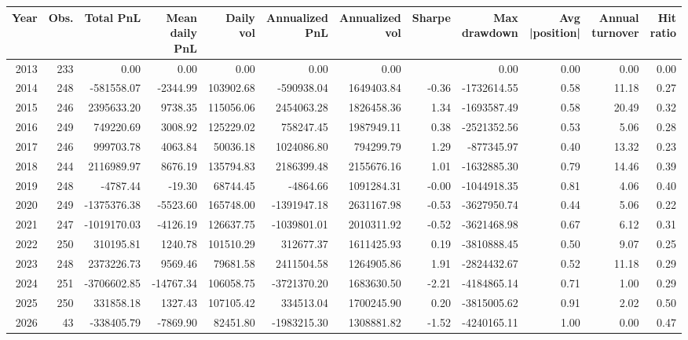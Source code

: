 \begin{tabular}{rrrrrrrrrrrr}
\toprule
Year & Obs. & Total PnL & Mean daily PnL & Daily vol & Annualized PnL & Annualized vol & Sharpe & Max drawdown & Avg |position| & Annual turnover & Hit ratio \\
\midrule
2013 & 233 & 0.00 & 0.00 & 0.00 & 0.00 & 0.00 &  & 0.00 & 0.00 & 0.00 & 0.00 \\
2014 & 248 & -581558.07 & -2344.99 & 103902.68 & -590938.04 & 1649403.84 & -0.36 & -1732614.55 & 0.58 & 11.18 & 0.27 \\
2015 & 246 & 2395633.20 & 9738.35 & 115056.06 & 2454063.28 & 1826458.36 & 1.34 & -1693587.49 & 0.58 & 20.49 & 0.32 \\
2016 & 249 & 749220.69 & 3008.92 & 125229.02 & 758247.45 & 1987949.11 & 0.38 & -2521352.56 & 0.53 & 5.06 & 0.28 \\
2017 & 246 & 999703.78 & 4063.84 & 50036.18 & 1024086.80 & 794299.79 & 1.29 & -877345.97 & 0.40 & 13.32 & 0.23 \\
2018 & 244 & 2116989.97 & 8676.19 & 135794.83 & 2186399.48 & 2155676.16 & 1.01 & -1632885.30 & 0.79 & 14.46 & 0.39 \\
2019 & 248 & -4787.44 & -19.30 & 68744.45 & -4864.66 & 1091284.31 & -0.00 & -1044918.35 & 0.81 & 4.06 & 0.40 \\
2020 & 249 & -1375376.38 & -5523.60 & 165748.00 & -1391947.18 & 2631167.98 & -0.53 & -3627950.74 & 0.44 & 5.06 & 0.22 \\
2021 & 247 & -1019170.03 & -4126.19 & 126637.75 & -1039801.01 & 2010311.92 & -0.52 & -3621468.98 & 0.67 & 6.12 & 0.31 \\
2022 & 250 & 310195.81 & 1240.78 & 101510.29 & 312677.37 & 1611425.93 & 0.19 & -3810888.45 & 0.50 & 9.07 & 0.25 \\
2023 & 248 & 2373226.73 & 9569.46 & 79681.58 & 2411504.58 & 1264905.86 & 1.91 & -2824432.67 & 0.52 & 11.18 & 0.29 \\
2024 & 251 & -3706602.85 & -14767.34 & 106058.75 & -3721370.20 & 1683630.50 & -2.21 & -4184865.14 & 0.71 & 1.00 & 0.29 \\
2025 & 250 & 331858.18 & 1327.43 & 107105.42 & 334513.04 & 1700245.90 & 0.20 & -3815005.62 & 0.91 & 2.02 & 0.50 \\
2026 & 43 & -338405.79 & -7869.90 & 82451.80 & -1983215.30 & 1308881.82 & -1.52 & -4240165.11 & 1.00 & 0.00 & 0.47 \\
\bottomrule
\end{tabular}
